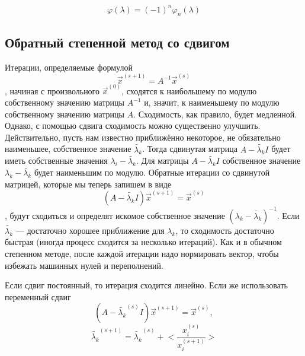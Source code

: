 \documentclass[a4paper,12pt,notitlepage,pdftex,headsepline]{scrartcl}
\begin{document}
\begin{equation}
\label{eq:char-eq-formulae}
\varphi\left(\lambda\right) = \left(-1\right)^n \varphi_n\left(\lambda\right)
\end{equation}
\subsection{Обратный степенной метод со сдвигом}
\label{ss:reverse}
Итерации, определяемые формулой
\begin{equation}
\label{eq:reverse-method}
\vec{x}^{\left(s + 1\right)} = A^{-1} \vec{x}^{\left(s\right)}
\end{equation}
, начиная с произвольного $\vec{x}^{\left(0\right)}$, сходятся к наибольшему по модулю собственному значению матрицы $A^{-1}$ и, значит, к наименьшему по модулю собственному значению матрицы $A$.
Сходимость, как правило, будет медленной.
Однако, с помощью сдвига сходимость можно существенно улучшить.
Действительно, пусть нам известно приближённо некоторое, не обязательно наименьшее, собственное значение $\tilde{\lambda_k}$.
Тогда сдвинутая матрица $A - \tilde{\lambda_k} I$ будет иметь собственные значения $\lambda_i - \tilde{\lambda_k}$.
Для матрицы $A - \tilde{\lambda_k} I$ собственное значение $\lambda_k - \tilde{\lambda_k}$ будет наименьшим по модулю.
Обратные итерации со сдвинутой матрицей, которые мы теперь запишем в виде
\begin{equation}
\label{eq:reverse-iteration}
\left(A - \tilde{\lambda_k} I\right) \vec{x}^{\left(s+1\right)} = \vec{x}^{\left(s\right)}
\end{equation}
, будут сходиться и определят искомое собственное значение $\left(\lambda_k - \tilde{\lambda_k}\right)^{-1}$.
Если $\tilde{\lambda_k}$ --- достаточно хорошее приближение для $\lambda_k$, то сходимость достаточно быстрая (иногда процесс сходится за несколько итераций).
Как и в обычном степенном методе, после каждой итерации надо нормировать вектор, чтобы избежать машинных нулей и переполнений.

Если сдвиг постоянный, то итерация сходится линейно.
Если же использовать переменный сдвиг
\begin{equation}
  \label{eq:var-del}
  \left(A - \tilde{\lambda_k}^{\left(s\right)} I\right) \vec{x}^{\left(s+1\right)} = \vec{x}^{\left(s\right)},
\end{equation}
$$
  \tilde{\lambda_k}^{\left(s+1\right)} = \tilde{\lambda_k}^{\left(s\right)} + \genfrac{<}{>}{1pt}{0}{x_i^{\left(s\right)}}{x_i^{\left(s+1\right)}}$$
\end{document}
